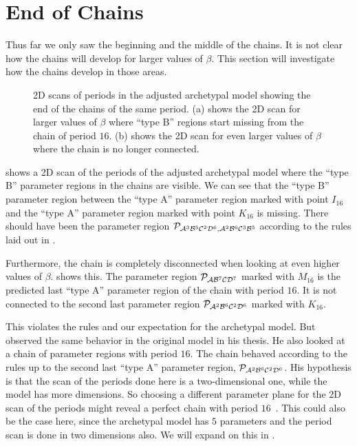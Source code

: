 \section{End of Chains}

Thus far we only saw the beginning and the middle of the chains.
It is not clear how the chains will develop for larger values of $\beta$.
This section will investigate how the chains develop in those areas.

\begin{figure}
	\centering
	\caption[2D scans of periods in the archetypal model showing the end of the chains]{
		2D scans of periods in the adjusted archetypal model showing the end of the chains of the same period.
		(a) shows the 2D scan for larger values of $\beta$ where ``type B'' regions start missing from the chain of period $16$.
		(b) shows the 2D scan for even larger values of $\beta$ where the chain is no longer connected.
	}
\end{figure}

 shows a 2D scan of the periods of the adjusted archetypal model where the ``type B'' parameter regions in the chains are visible.
We can see that the ``type B'' parameter region between the ``type A'' parameter region marked with point $I_{16}$ and the ``type A'' parameter region marked with point $K_{16}$ is missing.
There should have been the parameter region $\mathcal{P}_{\mathcal{A}^3\mathcal{B}^5\mathcal{C}^2\mathcal{D}^6, \mathcal{A}^2\mathcal{B}^6\mathcal{C}^3\mathcal{B}^5}$ according to the rules laid out in .

Furthermore, the chain is completely disconnected when looking at even higher values of $\beta$.
 shows this.
The parameter region $\mathcal{P}_{\mathcal{A}\mathcal{B}^7\mathcal{C}\mathcal{D}^7}$ marked with $M_{16}$ is the predicted last ``type A'' parameter region of the chain with period $16$.
It is not connected to the second last parameter region $\mathcal{P}_{\mathcal{A}^2\mathcal{B}^6\mathcal{C}^2\mathcal{D}^6}$ marked with $K_{16}$.

This violates the rules and our expectation for the archetypal model.
But  observed the same behavior in the original model in his thesis.
He also looked at a chain of parameter regions with period $16$.
The chain behaved according to the rules up to the second last ``type A'' parameter region, $\mathcal{P}_{\mathcal{A}^2\mathcal{B}^6\mathcal{C}^2\mathcal{D}^6}$.
His hypothesis is that the scan of the periods done here is a two-dimensional one, while the model has more dimensions.
So choosing a different parameter plane for the 2D scan of the periods might reveal a perfect chain with period $16$~\cite{akyuz2022}.
This could also be the case here, since the archetypal model has $5$ parameters and the period scan is done in two dimensions also.
We will expand on this in .
